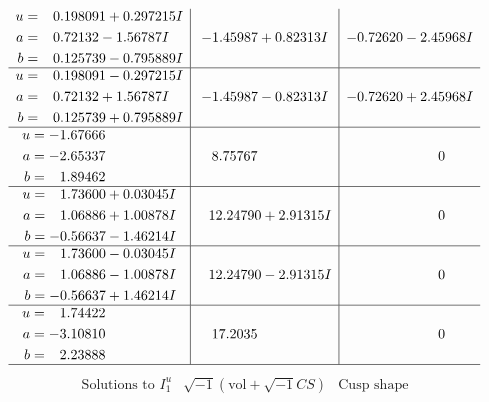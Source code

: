 \documentclass[1p]{elsarticle_modified}
\theoremstyle{definition}
\newcommand{\I}{\sqrt{-1}}
\begin{document}
$$\begin{array}{c|c|c}
\begin{aligned}
u &= \phantom{-}0.198091 + 0.297215 I \\
a &= \phantom{-}0.72132 - 1.56787 I \\
b &= \phantom{-}0.125739 - 0.795889 I\end{aligned}
 & -1.45987 + 0.82313 I & -0.72620 - 2.45968 I \\ \hline\begin{aligned}
u &= \phantom{-}0.198091 - 0.297215 I \\
a &= \phantom{-}0.72132 + 1.56787 I \\
b &= \phantom{-}0.125739 + 0.795889 I\end{aligned}
 & -1.45987 - 0.82313 I & -0.72620 + 2.45968 I \\ \hline\begin{aligned}
u &= -1.67666\phantom{ +0.000000I} \\
a &= -2.65337\phantom{ +0.000000I} \\
b &= \phantom{-}1.89462\phantom{ +0.000000I}\end{aligned}
 & \phantom{-}8.75767\phantom{ +0.000000I} & \phantom{-0.000000 } 0 \\ \hline\begin{aligned}
u &= \phantom{-}1.73600 + 0.03045 I \\
a &= \phantom{-}1.06886 + 1.00878 I \\
b &= -0.56637 - 1.46214 I\end{aligned}
 & \phantom{-}12.24790 + 2.91315 I & \phantom{-0.000000 } 0 \\ \hline\begin{aligned}
u &= \phantom{-}1.73600 - 0.03045 I \\
a &= \phantom{-}1.06886 - 1.00878 I \\
b &= -0.56637 + 1.46214 I\end{aligned}
 & \phantom{-}12.24790 - 2.91315 I & \phantom{-0.000000 } 0 \\ \hline\begin{aligned}
u &= \phantom{-}1.74422\phantom{ +0.000000I} \\
a &= -3.10810\phantom{ +0.000000I} \\
b &= \phantom{-}2.23888\phantom{ +0.000000I}\end{aligned}
 & \phantom{-}17.2035\phantom{ +0.000000I} & \phantom{-0.000000 } 0\\
 \hline 
 \end{array}$$\newpage$$\begin{array}{c|c|c}  
\text{Solutions to }I^u_{1}& \I (\text{vol} + \sqrt{-1}CS) & \text{Cusp shape}\\

\end{array}$$
\end{document}
